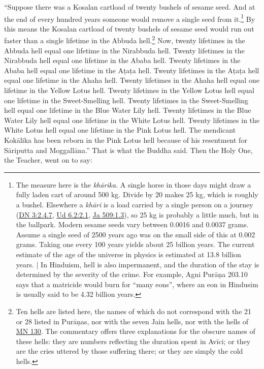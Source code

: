 \documentclass[12pt,openany]{book}%
\begin{document}
“Suppose there was a Kosalan cartload of twenty bushels of sesame seed. And at the end of every hundred years someone would remove a single seed from it.\footnote{The measure here is the \textit{\textsanskrit{khārika}}. A single horse in those days might draw a fully laden cart of around 500 kg. Divide by 20 makes 25 kg, which is roughly a bushel. Elsewhere a \textit{\textsanskrit{khāri}} is a load carried by a single person on a journey (\href{https://suttacentral.net/dn3/en/sujato\#2.4.7}{DN 3:2.4.7}, \href{https://suttacentral.net/ud6.2/en/sujato\#2.1}{Ud 6.2:2.1}, \href{https://suttacentral.net/ja509/en/sujato\#1.3}{Ja 509:1.3}), so 25 kg is probably a little much, but in the ballpark. Modern sesame seeds vary between 0.0016 and 0.0037 grams. Assume a single seed of 2500 years ago was on the small side of this at 0.002 grams. Taking one every 100 years yields about 25 billion years. The current estimate of the age of the universe in physics is estimated at 13.8 billion years. | In Hinduism, hell is also impermanent, and the duration of the stay is determined by the severity of the crime. For example, Agni \textsanskrit{Purāṇa} 203.10 says that a matricide would burn for “many eons”, where an eon in Hindusim is usually said to be 4.32 billion years. } By this means the Kosalan cartload of twenty bushels of sesame seed would run out faster than a single lifetime in the Abbuda hell.\footnote{Ten hells are listed here, the names of which do not correspond with the 21 or 28 listed in \textsanskrit{Purāṇas}, nor with the seven Jain hells, nor with the hells of \href{https://suttacentral.net/mn130/en/sujato}{MN 130}. The commentary offers three explanations for the obscure names of these hells: they are numbers reflecting the duration spent in \textsanskrit{Avīci}; or they are the cries uttered by those suffering there; or they are simply the cold hells. } Now, twenty lifetimes in the Abbuda hell equal one lifetime in the Nirabbuda hell. Twenty lifetimes in the Nirabbuda hell equal one lifetime in the Ababa hell. Twenty lifetimes in the Ababa hell equal one lifetime in the \textsanskrit{Aṭaṭa} hell. Twenty lifetimes in the \textsanskrit{Aṭaṭa} hell equal one lifetime in the Ahaha hell. Twenty lifetimes in the Ahaha hell equal one lifetime in the Yellow Lotus hell. Twenty lifetimes in the Yellow Lotus hell equal one lifetime in the Sweet-Smelling hell. Twenty lifetimes in the Sweet-Smelling hell equal one lifetime in the Blue Water Lily hell. Twenty lifetimes in the Blue Water Lily hell equal one lifetime in the White Lotus hell. Twenty lifetimes in the White Lotus hell equal one lifetime in the Pink Lotus hell. The mendicant \textsanskrit{Kokālika} has been reborn in the Pink Lotus hell because of his resentment for \textsanskrit{Sāriputta} and \textsanskrit{Moggallāna}.” That is what the Buddha said. Then the Holy One, the Teacher, went on to say: 
\end{document}
